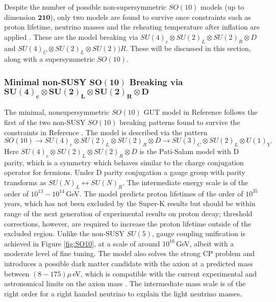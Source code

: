 \documentclass{article}
\begin{document}
Despite the number of possible non-supersymmetric $SO(10)$ models (up to dimension $\bm{210}$), only two models are found to survive once constraints such as proton lifetime, neutrino masses and the reheating temperature after inflation are applied \cite{SO10_UnificationDM}. These are the model breaking via $SU(4)_c \otimes SU(2)_L \otimes SU(2)_R\otimes D$ and $SU(4)_C \otimes SU(2)_L \otimes SU(2))R$. These will be discussed in this section, along with a supersymmetric $SO(10)$.

\subsubsection{Minimal non-SUSY $\bm{SO(10)}$ Breaking via $\bm{SU(4)_c \otimes SU(2)_L \otimes SU(2)_R \otimes D}$}
\label{sec:GUT_SO10_1}

The minimal, nonsupersymmetric $SO(10)$ GUT model in Reference \cite{SO10_1} follows the first of the two non-SUSY $SO(10)$ breaking patterns found to survive the constraints in Reference \cite{SO10_UnificationDM}. The model is described via the pattern
\begin{equation}
SO(10)\rightarrow SU(4)_c \otimes SU(2)_L \otimes SU(2)_R \otimes D \rightarrow SU(3)_C\otimes SU(2)_L \otimes U(1)_Y.
\end{equation}
Here $SU(4)_c \otimes SU(2)_L \otimes SU(2)_R\otimes D$ is the Pati-Salam model with D parity\cite{DParity}, which is a symmetry which behaves similar to the charge conjugation operator for fermions. Under D parity conjugation a gauge group with parity transforms as $SU(N)_L \leftrightarrow SU(N)_R$. The intermediate energy scale is of the order of $10^{13}-10^{14}\,$GeV.
The model predicts proton lifetimes of the order of $10^{35}$ years, which has not been excluded by the Super-K results but should be within range of the next generation of experimental results on proton decay; threshold corrections, however, are required to increase the proton lifetime outside of the excluded region. 
Unlike the non-SUSY $SU(5)$, gauge coupling unification is achieved in Figure \ref{fig:SO10}, at a scale of around $10^{16}\,$GeV, albeit with a moderate level of fine tuning. The model also solves the strong CP problem and introduces a possible dark matter candidate with the axion at a predicted mass between $(8-175)\mu\,$eV, which is compatible with the current experimental and astronomical limits on the axion mass \cite{AxionMass}. The intermediate mass scale is of the right order for a right handed neutrino to explain the light neutrino masses.
\end{document}
